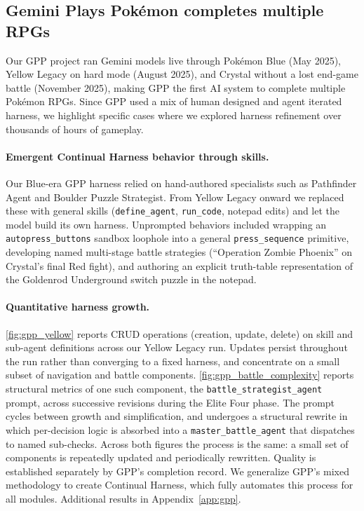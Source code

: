 \subsection{Gemini Plays Pok\'emon completes multiple RPGs}\label{sec:exp:gpp}

Our GPP project ran Gemini models live through Pok\'emon Blue (May 2025), Yellow Legacy on hard mode (August 2025), and Crystal without a lost end-game battle (November 2025), making GPP the first AI system to complete multiple Pok\'emon RPGs. Since GPP used a mix of human designed and agent iterated harness, we highlight specific cases where we explored harness refinement over thousands of hours of gameplay.

\paragraph{Emergent Continual Harness behavior through skills.} Our Blue-era GPP harness relied on hand-authored specialists such as Pathfinder Agent and Boulder Puzzle Strategist. From Yellow Legacy onward we replaced these with general skills (\texttt{define\_agent}, \texttt{run\_code}, notepad edits) and let the model build its own harness. Unprompted behaviors included wrapping an \texttt{autopress\_buttons} sandbox loophole into a general \texttt{press\_sequence} primitive, developing named multi-stage battle strategies (``Operation Zombie Phoenix'' on Crystal's final Red fight), and authoring an explicit truth-table representation of the Goldenrod Underground switch puzzle in the notepad.

\paragraph{Quantitative harness growth.} \cref{fig:gpp_yellow} reports CRUD operations (creation, update, delete) on skill and sub-agent definitions across our Yellow Legacy run. Updates persist throughout the run rather than converging to a fixed harness, and concentrate on a small subset of navigation and battle components. \cref{fig:gpp_battle_complexity} reports structural metrics of one such component, the \texttt{battle\_strategist\_agent} prompt, across successive revisions during the Elite Four phase. The prompt cycles between growth and simplification, and undergoes a structural rewrite in which per-decision logic is absorbed into a \texttt{master\_battle\_agent} that dispatches to named sub-checks. Across both figures the process is the same: a small set of components is repeatedly updated and periodically rewritten. Quality is established separately by GPP's completion record. We generalize GPP's mixed methodology to create Continual Harness, which fully automates this process for all modules. Additional results in Appendix~\ref{app:gpp}.

